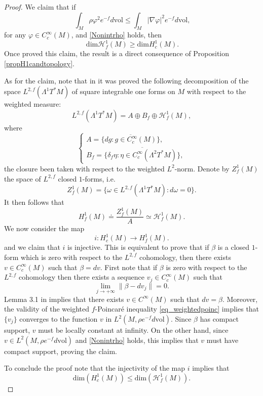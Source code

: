 \documentclass[11pt, leqno]{amsart}
\begin{document}
\begin{proof}
We claim that if 
\[
\ \int_{M}\rho\varphi^{2}e^{-f}d\mathrm{vol}\leq \int_{M}|\nabla \varphi|^{2}e^{-f}d\mathrm{vol},
\] 
for any $\varphi\in C_{c}^{\infty}(M)$, and \eqref{Nonintrho} holds, then
\[
\ \mathrm{dim}\mathcal{H}^{1}_{f}(M)\geq \mathrm{dim}H^{1}_{c}(M). 
\]
Once proved this claim, the result is a direct consequence of Proposition \ref{propH1candtopology}.

As for the claim, note that in \cite{Bue} it was proved the following decomposition of the space $L^{2,f}(\Lambda^1T^*M)$ of square integrable one forms on $M$ with respect to the weighted measure:
\[
L^{2,f}(\Lambda^1T^*M)=A\oplus B_f \oplus \mathcal{H}^{1}_{f}(M),
\]
where
\[
\begin{cases}
A=\overline{\{dg: g\in C^\infty_c(M)\}},\\
B_f=\overline{\{\delta_f\eta: \eta\in C^{\infty}_c(\Lambda^2T^*M)\}},
\end{cases}
\]
the closure been taken with respect to the weighted $L^2$-norm.
Denote by $Z^1_f(M)$ the space of $L^{2,f}$ closed $1$-forms, i.e. 
\[
Z^1_f(M)=\{\omega \in L^{2,f}(\Lambda^1T^*M): d\omega=0\}.
\]
It then follows that 
\[
H^1_f(M)\doteq\frac{Z^1_f(M)}{A}\simeq \mathcal{H}^{1}_{f}(M).
\]
We now consider the map
\[
i:H^1_c(M)\rightarrow H^1_f(M).
\]
and we claim that $i$ is injective. This is equivalent to prove that if $\beta$ is a closed $1$-form which is zero with respect to the $L^{2,f}$ cohomology, then there exists $v\in C_{c}^{\infty}(M)$ such that $\beta=dv$. First note that if $\beta$ is zero with respect to the $L^{2,f}$ cohomology then there exists a sequence $v_j\in C^{\infty}_c(M)$ such that
\[
\lim_{j\rightarrow+\infty}\|\beta-d v_j\|=0. 
\]
Lemma 3.1 in \cite{KS} implies that there exists $v\in C^{\infty}(M)$ such that $dv=\beta$. Moreover, the validity of the weighted $f$-Poincar\'e inequality \eqref{eq_weightedpoinc} implies that $\{v_j\}$ converges to the function $v$ in $L^2(M, \rho e^{-f}d\mathrm{vol})$. Since $\beta$ has compact support, $v$ must be locally constant at infinity. On the other hand, since $v\in L^2(M, \rho e^{-f}d\mathrm{vol})$ and \eqref{Nonintrho} holds, this implies that $v$ must have compact support, proving the claim.

\noindent To conclude the proof note that the injectivity of the map $i$ implies that
\[
\mathrm{dim}(H_c^1(M))\leq \mathrm{dim}(\mathcal{H}^{1}_{f}(M)).
\]

\end{proof}
\end{document}
